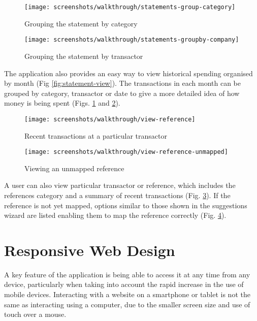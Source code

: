 \begin{figure}
\centering
\texttt{[image: screenshots/walkthrough/statements-group-category]}
\caption{Grouping the statement by category}
\label{fig:statements-group-category}
\end{figure}

\begin{figure}
\centering
\texttt{[image: screenshots/walkthrough/statements-groupby-company]}
\caption{Grouping the statement by transactor}
\label{fig:statements-groupby-company}
\end{figure}

The application also provides an easy way to view historical spending organised by month (Fig \ref{fig:statement-view}). The transactions in each month can be grouped by category, transactor or date to give a more detailed idea of how money is being spent (Figs. \ref{fig:statements-group-category} and \ref{fig:statements-groupby-company}).

\begin{figure}
\centering
\texttt{[image: screenshots/walkthrough/view-reference]}
\caption{Recent transactions at a particular transactor}
\label{fig:view-reference}
\end{figure}

\begin{figure}
\centering
\texttt{[image: screenshots/walkthrough/view-reference-unmapped]}
\caption{Viewing an unmapped reference}
\label{fig:view-reference-unmapped}
\end{figure}

A user can also view particular transactor or reference, which includes the references category and a summary of recent transactions (Fig. \ref{fig:view-reference}). If the reference is not yet mapped, options similar to those shown in the suggestions wizard are listed enabling them to map the reference correctly (Fig. \ref{fig:view-reference-unmapped}). 

\section[Responsive Design]{Responsive Web Design}
A key feature of the application is being able to access it at any time from any device, particularly when taking into account the rapid increase in the use of mobile devices.  Interacting with a website on a smartphone or tablet is not the same as interacting using a computer, due to the smaller screen size and use of touch over a mouse.

